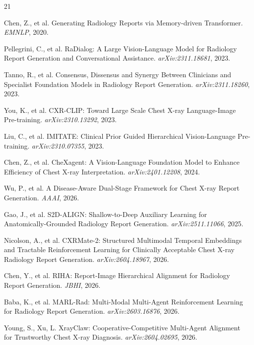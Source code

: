 \documentclass[runningheads,10pt]{llncs}
\begin{document}
\begin{thebibliography}{21}

 Chen, Z., et al. Generating Radiology Reports via Memory-driven Transformer. \emph{EMNLP}, 2020.

 Pellegrini, C., et al. RaDialog: A Large Vision-Language Model for Radiology Report Generation and Conversational Assistance. \emph{arXiv:2311.18681}, 2023.

 Tanno, R., et al. Consensus, Dissensus and Synergy Between Clinicians and Specialist Foundation Models in Radiology Report Generation. \emph{arXiv:2311.18260}, 2023.

 You, K., et al. CXR-CLIP: Toward Large Scale Chest X-ray Language-Image Pre-training. \emph{arXiv:2310.13292}, 2023.

 Liu, C., et al. IMITATE: Clinical Prior Guided Hierarchical Vision-Language Pre-training. \emph{arXiv:2310.07355}, 2023.

 Chen, Z., et al. CheXagent: A Vision-Language Foundation Model to Enhance Efficiency of Chest X-ray Interpretation. \emph{arXiv:2401.12208}, 2024.

 Wu, P., et al. A Disease-Aware Dual-Stage Framework for Chest X-ray Report Generation. \emph{AAAI}, 2026.

 Gao, J., et al. S2D-ALIGN: Shallow-to-Deep Auxiliary Learning for Anatomically-Grounded Radiology Report Generation. \emph{arXiv:2511.11066}, 2025.

 Nicolson, A., et al. CXRMate-2: Structured Multimodal Temporal Embeddings and Tractable Reinforcement Learning for Clinically Acceptable Chest X-ray Radiology Report Generation. \emph{arXiv:2604.18967}, 2026.

 Chen, Y., et al. RIHA: Report-Image Hierarchical Alignment for Radiology Report Generation. \emph{JBHI}, 2026.

 Baba, K., et al. MARL-Rad: Multi-Modal Multi-Agent Reinforcement Learning for Radiology Report Generation. \emph{arXiv:2603.16876}, 2026.

 Young, S., Xu, L. XrayClaw: Cooperative-Competitive Multi-Agent Alignment for Trustworthy Chest X-ray Diagnosis. \emph{arXiv:2604.02695}, 2026.


\end{thebibliography}
\end{document}
